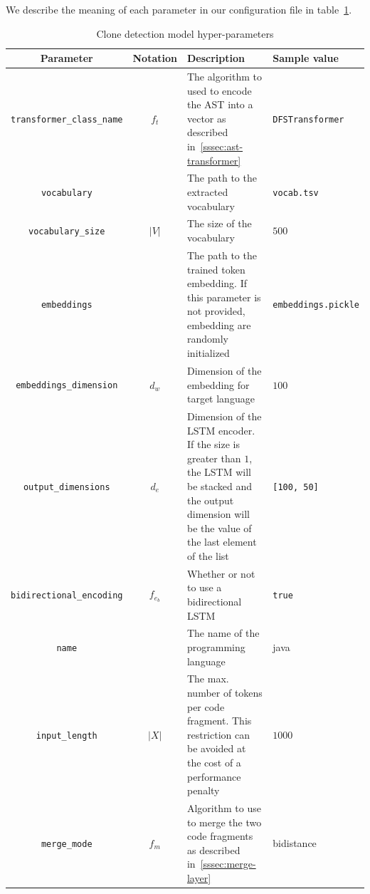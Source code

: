 \begin{figure}
  
\end{figure}

We describe the meaning of each parameter in our configuration file in
table~\ref{tab:hyper-parameters}.

\begin{table}[p]
  \caption{\label{tab:hyper-parameters}Clone detection model hyper-parameters}
  \begin{center}
    \begin{tabularx}{\linewidth}{c c X l}
      \toprule
      Parameter & Notation & Description & Sample value\\
      \toprule
      \lstinline{transformer_class_name} & $f_t$ & The algorithm to used to encode
      the AST into a vector as described in~\ref{sssec:ast-transformer} & \lstinline{DFSTransformer}\\
      \lstinline{vocabulary} & & The path to the extracted vocabulary & \lstinline{vocab.tsv}\\
      \lstinline{vocabulary_size} & $|V|$ & The size of the vocabulary & $500$\\
      \lstinline{embeddings} & & The path to the trained token embedding. If
      this parameter is not provided, embedding are randomly initialized & \lstinline{embeddings.pickle}\\
      \lstinline{embeddings_dimension} & $d_w$ & Dimension of the embedding for
      target language & $100$\\
      \lstinline{output_dimensions} & $d_e$ & Dimension of the
      LSTM encoder. If the size is greater than $1$, the LSTM will be stacked
      and the output dimension will be the value of the last element of the list
      & \lstinline{[100, 50]}\\
      \lstinline{bidirectional_encoding} & $f_{e_b}$ & Whether or not to use a
      bidirectional LSTM & \lstinline{true}\\
      \lstinline{name} & & The name of the programming language & java\\
      \lstinline{input_length} & $|X|$ & The max. number of tokens per code
      fragment. This restriction can be avoided at the cost of a performance
      penalty & $1000$\\
      \lstinline{merge_mode} & $f_m$ & Algorithm to use to merge the two code
      fragments as described in~\ref{sssec:merge-layer} & bidistance
    \end{tabularx}
  \end{center}
\end{table}
